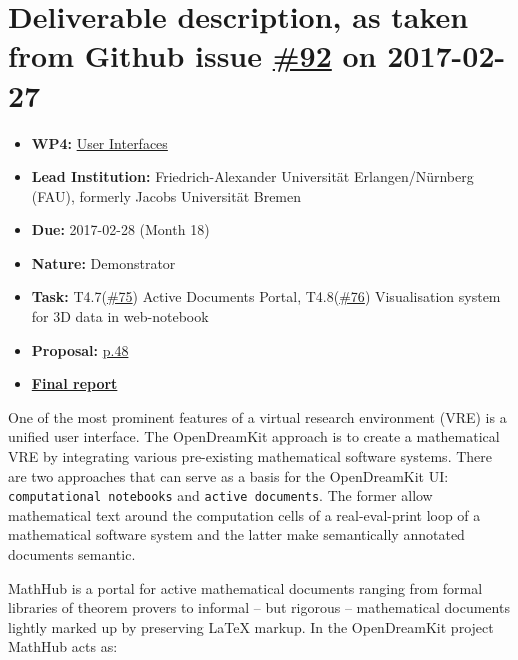 \section*{\texorpdfstring{Deliverable description, as taken from Github
issue
\href{https://github.com/OpenDreamKit/OpenDreamKit/issues/92}{\#92} on
2017-02-27}{Deliverable description, as taken from Github issue \#92 on 2017-02-27}}\label{deliverable-description-as-taken-from-github-issue-92-on-2017-02-27}

\begin{itemize}
\tightlist
\item
  \textbf{WP4:}
  \href{https://github.com/OpenDreamKit/OpenDreamKit/tree/master/WP4}{User
  Interfaces}
\item
  \textbf{Lead Institution:} Friedrich-Alexander Universität
  Erlangen/Nürnberg (FAU), formerly Jacobs Universität Bremen
\item
  \textbf{Due:} 2017-02-28 (Month 18)
\item
  \textbf{Nature:} Demonstrator
\item
  \textbf{Task:}
  T4.7(\href{https://github.com/OpenDreamKit/OpenDreamKit/issues/75}{\#75})
  Active Documents Portal,
  T4.8(\href{https://github.com/OpenDreamKit/OpenDreamKit/issues/76}{\#76})
  Visualisation system for 3D data in web-notebook
\item
  \textbf{Proposal:}
  \href{https://github.com/OpenDreamKit/OpenDreamKit/raw/master/Proposal/proposal-www.pdf}{p.48}
\item
  \href{https://github.com/OpenDreamKit/OpenDreamKit/raw/master/WP4/D4.3/report-final.pdf}{\textbf{Final
  report}}
\end{itemize}

One of the most prominent features of a virtual research environment
(VRE) is a unified user interface. The OpenDreamKit approach is to
create a mathematical VRE by integrating various pre-existing
mathematical software systems. There are two approaches that can serve
as a basis for the OpenDreamKit UI: \texttt{computational\ notebooks}
and \texttt{active\ documents}. The former allow mathematical text
around the computation cells of a real-eval-print loop of a mathematical
software system and the latter make semantically annotated documents
semantic.

MathHub is a portal for active mathematical documents ranging from
formal libraries of theorem provers to informal -- but rigorous --
mathematical documents lightly marked up by preserving LaTeX markup. In
the OpenDreamKit project MathHub acts as:

